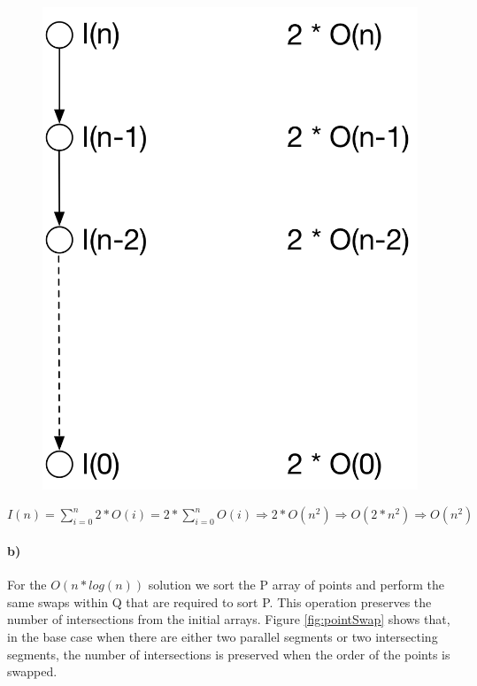 \begin{figure}[H]
    \centering
    \includegraphics[scale=0.5]{1a)}
\end{figure}

$I(n) = \sum_{i=0}^{n} 2 * O(i) = 2 * \sum_{i=0}^{n} O(i) \Rightarrow  2 * O(n^2) \Rightarrow  O(2 * n^2) \Rightarrow O(n^2)$


\paragraph{b)} For the $O(n*log(n))$ solution we sort the P array of points and perform the same swaps within Q that are required to sort P.
This operation preserves the number of intersections from the initial arrays.
Figure \ref{fig:pointSwap} shows that, in the base case when there are either two parallel segments or two intersecting segments, the number of intersections is preserved when the order of the points is swapped.

